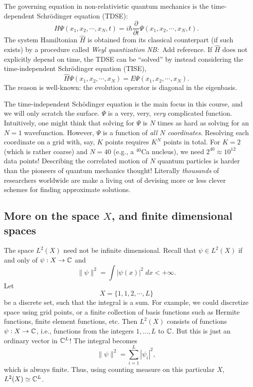 \documentclass{report}
\theoremstyle{plain}
\theoremstyle{definition}
\newcommand{\note}[1]{{\color{red}\emph{NB:}~#1}}
\begin{document}
The governing equation in non-relativistic quantum mechanics is the
time-dependent Schr\"odinger equation (TDSE):
\begin{equation}
  \hat{H} \Psi(x_1,x_2,\cdots,x_N,t) = i \hbar \frac{\partial}{\partial t} \Psi(x_1,x_2,\cdots,x_N,t).
\end{equation}
The system Hamiltonian $\hat{H}$ is obtained from its classical
counterpart (if such exists) by a procedure called \emph{Weyl
  quantization} \note{Add reference}. If $\hat{H}$ does not explicitly depend on time, the
TDSE can be ``solved'' by instead considering the time-independent
Schr\"odinger equation (TISE),
\begin{equation}
  \hat{H} \Psi(x_1,x_2,\cdots,x_N) = E \Psi(x_1,x_2,\cdots,x_N). \label{eq:TISE}
\end{equation}
The reason is well-known: the evolution operator is diagonal in the
eigenbasis.

The time-independent Sch\"odinger equation is the main focus in this
course, and we will only scratch the surface. $\Psi$ is a very, very,
\emph{very} complicated function. Intuitively, one might think that
solving for $\Psi$ is $N$ times as hard as solving for an $N=1$
wavefunction. However, $\Psi$ is a function of \emph{all $N$
  coordinates}. Resolving each coordinate on a grid with, say, $K$
points requires $K^N$ points in total. For $K=2$ (which is rather
coarse) and $N=40$ (e.g., a ${}^{40}$Ca nucleus), we need $2^{40}
\approx 10^{12}$ data points! Describing the correlated motion of $N$
quantum particles is harder than the pioneers of quantum mechanics thought! Literally
\emph{thousands} of researchers worldwide are make a living out of
devising more or less clever schemes for finding approximate
solutions.


\subsection{More on the space $X$, and finite dimensional spaces}


The space $L^2(X)$ need not be infinite dimensional. Recall that
$\psi \in L^2(X)$ if and only of $\psi : X \to \mathbb{C}$ and 
\[ \|\psi\|^2 = \int |\psi(x)|^2 \; dx < +\infty. \]
Let
\[ X = \{ 1, 1, 2, \cdots, L \} \]
be a discrete set, such that the integral is a sum. For example, we
could discretize space using grid points, or a finite collection of
basis functions such as Hermite functions, finite element functions,
etc. Then  $L^2(X)$ consists of functions $\psi : X \to \mathbb{C}$, i.e.,
functions from the integers $1,\ldots,L$ to $\mathbb{C}$. But this is just
an ordinary vector in $\mathbb{C}^L$! The integral becomes
\[ \|\psi\|^2 = \sum_{i=1}^L |\psi_i|^2, \] which is always finite.
Thus, using counting measure on this particular $X$, $L^2(X) \simeq \mathbb{C}^L$.
\end{document}
